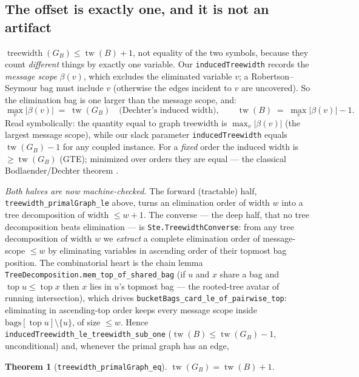 \documentclass[11pt]{article}
\newtheorem{theorem}{Theorem}
\newcommand{\lean}[1]{\texttt{#1}}
\newcommand{\bagof}[1]{\beta(#1)}
\begin{document}
\subsection*{The offset is exactly one, and it is not an artifact}
$\operatorname{treewidth}(G_B) \le \operatorname{tw}(B) + 1$, not
equality of the two symbols, because they count \emph{different} things
by exactly one variable.  Our \lean{inducedTreewidth} records the
\emph{message scope} $\bagof{v}$, which excludes the eliminated
variable $v$; a Robertson--Seymour bag must include $v$ (otherwise the
edges incident to $v$ are uncovered).  So the elimination bag is one
larger than the message scope, and:
\[
  \max_v |\bagof{v}| \;=\; \operatorname{tw}(G_B)
  \quad\text{(Dechter's induced width)},
  \qquad
  \operatorname{tw}(B) \;=\; \max_v |\bagof{v}| - 1 .
\]
Read symbolically: the quantity equal to graph treewidth is
$\max_v |\bagof{v}|$ (the largest message scope), while our slack
parameter \lean{inducedTreewidth} equals $\operatorname{tw}(G_B) - 1$
for any coupled instance.  For a \emph{fixed} order the induced width is
$\ge \operatorname{tw}(G_B)$ (GTE); minimized over orders they are equal
--- the classical Bodlaender/Dechter theorem
\citep{bodlaender1998arboretum,dechter2003constraint}.

\emph{Both halves are now machine-checked.}  The forward (tractable)
half, \lean{treewidth\_primalGraph\_le} above, turns an elimination
order of width $w$ into a tree decomposition of width $\le w+1$.  The
converse --- the deep half, that no tree decomposition beats
elimination --- is \lean{Ste.TreewidthConverse}: from any tree
decomposition of width $w$ we \emph{extract} a complete elimination
order of message-scope $\le w$ by eliminating variables in ascending
order of their topmost bag position.  The combinatorial heart is the
chain lemma \lean{TreeDecomposition.mem\_top\_of\_shared\_bag} (if $u$
and $x$ share a bag and $\operatorname{top} u \le \operatorname{top} x$
then $x$ lies in $u$'s topmost bag --- the rooted-tree avatar of
running intersection), which drives
\lean{bucketBags\_card\_le\_of\_pairwise\_top}: eliminating in
ascending-top order keeps every message scope inside
$\mathrm{bags}[\operatorname{top} u] \setminus \{u\}$, of size $\le w$.
Hence \lean{inducedTreewidth\_le\_treewidth\_sub\_one}
($\operatorname{tw}(B) \le \operatorname{tw}(G_B) - 1$,
unconditional) and, whenever the primal graph has an edge,

\begin{theorem}[\lean{treewidth\_primalGraph\_eq}]
$\operatorname{tw}(G_B) = \operatorname{tw}(B) + 1$.
\end{theorem}
\end{document}
